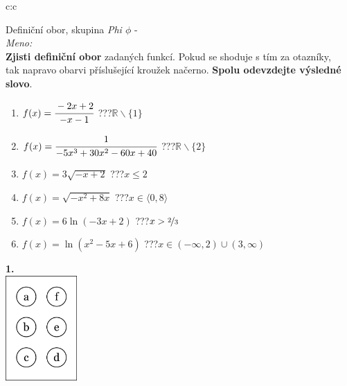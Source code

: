 \documentclass[10pt]{report}
\begin{document}
\begin{tabular}{c:c}
\begin{minipage}[c][99mm][t]{0.49\linewidth}
\begin{center}
\vspace{7mm}
{\huge Definiční obor, skupina \textit{Phi $\phi$} -}\\[4.5mm]
\textit{Meno:}\phantom{xxxxxxxxxxxxxxxxxxxxxxxxxxxxxxxxxxxxxxxxxxxxxxxxxxxxxxxxxxxxxxxxx}\\[3.5mm]
\textbf{Zjisti definiční obor} zadaných funkcí. Pokud se shoduje s tím za otazníky,\\tak napravo obarvi příslušející kroužek načerno. \textbf{Spolu odevzdejte výsledné slovo}.\\[3mm]
\begin{minipage}{0.77\linewidth}
\begin{center}
\begin{varwidth}{\textwidth}
\begin{enumerate}
\normalsize
\item $f(x)=\cfrac{-2x+2}{-x-1}$\quad \dotfill\; ???\;\dotfill \quad $\mathbb{R}\smallsetminus\{1\}$
\item $f(x)=\cfrac{1}{-5x^3+30x^2-60x+40}$\quad \dotfill\; ???\;\dotfill \quad $\mathbb{R}\smallsetminus\{2\}$
\item $f(x)=3\sqrt{-x+2}$\quad \dotfill\; ???\;\dotfill \quad $x\leq2$
\item $f(x)=\sqrt{-x^2+8x}$\quad \dotfill\; ???\;\dotfill \quad $x\in\langle0 , 8\rangle$
\item $f(x)=6\ln{(-3x+2)}$\quad \dotfill\; ???\;\dotfill \quad $x>\nicefrac{2}{3}$
\item $f(x)=\ln{(x^2-5x+6)}$\quad \dotfill\; ???\;\dotfill \quad $x\in(-\infty , 2)\cup(3 , \infty)$
\end{enumerate}
\end{varwidth}
\end{center}
\end{minipage}
\begin{minipage}{0.20\linewidth}
\begin{center}
{\Huge\bfseries 1.} \\[2mm]
\includegraphics[height=40mm]{../images/braille.png}

\end{center}
\end{minipage}
\end{center}
\end{minipage}
\end{tabular}
\end{document}
